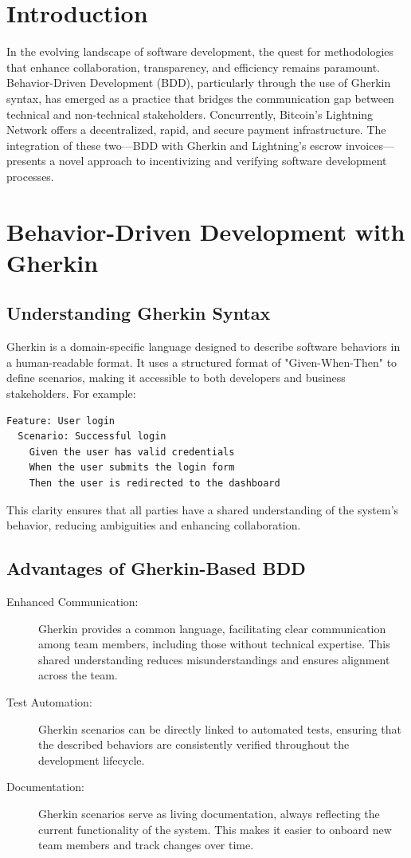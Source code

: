 \documentclass[12pt]{article}
\begin{document}
\section*{Introduction}
In the evolving landscape of software development, the quest for methodologies that enhance collaboration, transparency, and efficiency remains paramount. Behavior-Driven Development (BDD), particularly through the use of Gherkin syntax, has emerged as a practice that bridges the communication gap between technical and non-technical stakeholders. Concurrently, Bitcoin's Lightning Network offers a decentralized, rapid, and secure payment infrastructure. The integration of these two—BDD with Gherkin and Lightning's escrow invoices—presents a novel approach to incentivizing and verifying software development processes.

\section*{Behavior-Driven Development with Gherkin}
\subsection*{Understanding Gherkin Syntax}
Gherkin is a domain-specific language designed to describe software behaviors in a human-readable format. It uses a structured format of "Given-When-Then" to define scenarios, making it accessible to both developers and business stakeholders. For example:

\begin{verbatim}
Feature: User login
  Scenario: Successful login
    Given the user has valid credentials
    When the user submits the login form
    Then the user is redirected to the dashboard
\end{verbatim}

This clarity ensures that all parties have a shared understanding of the system's behavior, reducing ambiguities and enhancing collaboration.
\subsection*{Advantages of Gherkin-Based BDD}
\begin{description}
    \item[Enhanced Communication:] Gherkin provides a common language, facilitating clear communication among team members, including those without technical expertise. This shared understanding reduces misunderstandings and ensures alignment across the team.
    \item[Test Automation:] Gherkin scenarios can be directly linked to automated tests, ensuring that the described behaviors are consistently verified throughout the development lifecycle.
    \item[Documentation:] Gherkin scenarios serve as living documentation, always reflecting the current functionality of the system. This makes it easier to onboard new team members and track changes over time.
\end{description}
\end{document}
